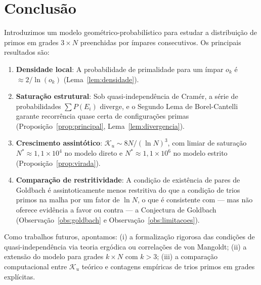 \documentclass{article}
\begin{document}
	\section{Conclusão}
	\label{sec:conclusao}
	
	Introduzimos um modelo geométrico-probabilístico para estudar a
	distribuição de primos em grades $3 \times N$ preenchidas por
	ímpares consecutivos. Os principais resultados são:
	
	\begin{enumerate}
		\item \textbf{Densidade local}: A probabilidade de primalidade
		para um ímpar $o_k$ é $\approx 2/\ln(o_k)$
		(Lema~\ref{lem:densidade}).
		
		\item \textbf{Saturação estrutural}: Sob quasi-independência
		de Cramér, a série de probabilidades $\sum P(E_i)$ diverge,
		e o Segundo Lema de Borel-Cantelli garante recorrência quase
		certa de configurações primas (Proposição~\ref{prop:principal},
		Lema~\ref{lem:divergencia}).
		
		\item \textbf{Crescimento assintótico}: $\mathcal{K}_u \sim
		8N/(\ln N)^3$, com limiar de saturação $N^* \approx 1{,}1
		\times 10^4$ no modelo direto e $N^* \approx 1{,}1 \times 10^6$
		no modelo estrito (Proposição~\ref{prop:virada}).
		
		\item \textbf{Comparação de restritividade}: A condição de
		existência de pares de Goldbach é assintoticamente menos
		restritiva do que a condição de trios primos na malha por
		um fator de $\ln N$, o que é consistente com — mas não oferece evidência a favor ou contra — a Conjectura de Goldbach
		(Observação~\ref{obs:goldbach} e Observação~\ref{obs:limitacoes}).
	\end{enumerate}
	
	Como trabalhos futuros, apontamos: (i) a formalização rigorosa das
	condições de quasi-independência via teoria ergódica ou correlações
	de von Mangoldt; (ii) a extensão do modelo para grades $k \times N$
	com $k > 3$; (iii) a comparação computacional entre $\mathcal{K}_u$
	teórico e contagens empíricas de trios primos em grades explícitas.
	
\end{document}
